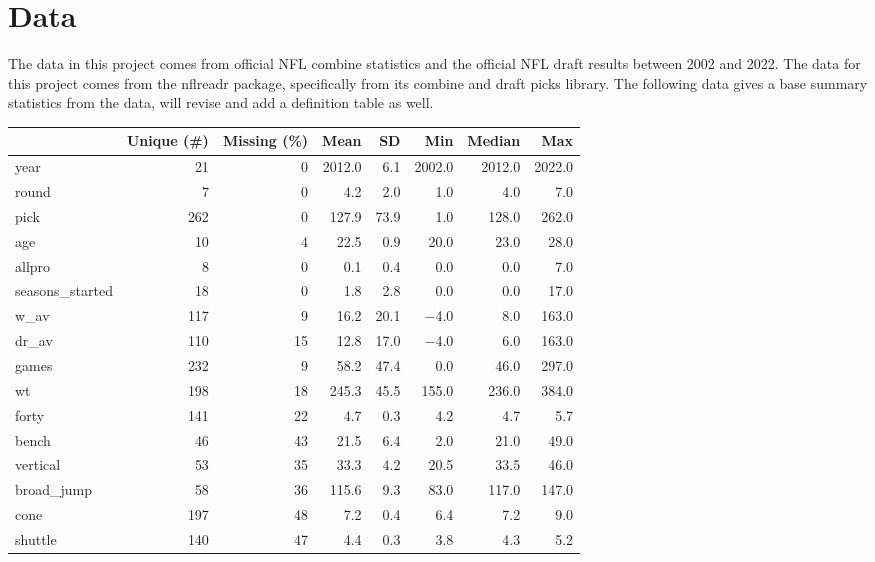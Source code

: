 \documentclass[12pt,english]{article}
\begin{document}
\section{Data}\label{sec:data}
The data in this project comes from official NFL combine statistics and the official NFL draft results between 2002 and 2022. The data for this project comes from the nflreadr package, specifically from its combine and draft picks library. The following data gives a base summary statistics from the data, will revise and add a definition table as well. 

\begin{table}[ht]
\centering
\begin{tabular}{lrrrrrrr}
\toprule
  & Unique (\#) & Missing (\%) & Mean & SD & Min & Median & Max\\
\midrule
year & 21 & 0 & \num{2012.0} & \num{6.1} & \num{2002.0} & \num{2012.0} & \num{2022.0}\\
round & 7 & 0 & \num{4.2} & \num{2.0} & \num{1.0} & \num{4.0} & \num{7.0}\\
pick & 262 & 0 & \num{127.9} & \num{73.9} & \num{1.0} & \num{128.0} & \num{262.0}\\
age & 10 & 4 & \num{22.5} & \num{0.9} & \num{20.0} & \num{23.0} & \num{28.0}\\
allpro & 8 & 0 & \num{0.1} & \num{0.4} & \num{0.0} & \num{0.0} & \num{7.0}\\
seasons\_started & 18 & 0 & \num{1.8} & \num{2.8} & \num{0.0} & \num{0.0} & \num{17.0}\\
w\_av & 117 & 9 & \num{16.2} & \num{20.1} & \num{-4.0} & \num{8.0} & \num{163.0}\\
dr\_av & 110 & 15 & \num{12.8} & \num{17.0} & \num{-4.0} & \num{6.0} & \num{163.0}\\
games & 232 & 9 & \num{58.2} & \num{47.4} & \num{0.0} & \num{46.0} & \num{297.0}\\
wt & 198 & 18 & \num{245.3} & \num{45.5} & \num{155.0} & \num{236.0} & \num{384.0}\\
forty & 141 & 22 & \num{4.7} & \num{0.3} & \num{4.2} & \num{4.7} & \num{5.7}\\
bench & 46 & 43 & \num{21.5} & \num{6.4} & \num{2.0} & \num{21.0} & \num{49.0}\\
vertical & 53 & 35 & \num{33.3} & \num{4.2} & \num{20.5} & \num{33.5} & \num{46.0}\\
broad\_jump & 58 & 36 & \num{115.6} & \num{9.3} & \num{83.0} & \num{117.0} & \num{147.0}\\
cone & 197 & 48 & \num{7.2} & \num{0.4} & \num{6.4} & \num{7.2} & \num{9.0}\\
shuttle & 140 & 47 & \num{4.4} & \num{0.3} & \num{3.8} & \num{4.3} & \num{5.2}\\
\bottomrule
\end{tabular}
\end{table}
\end{document}
